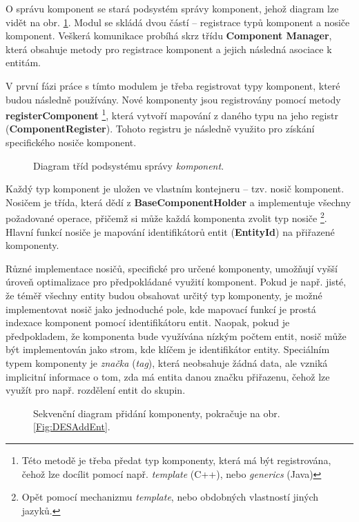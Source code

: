 O správu komponent se stará podsystém správy komponent, jehož diagram lze vidět na obr. \ref{Fig:DESCompDiag}. Modul se skládá dvou částí -- registrace typů komponent a nosiče komponent. Veškerá komunikace probíhá skrz třídu \textbf{Component Manager}, která obsahuje metody pro registrace komponent a jejich následná asociace k entitám. 

V první fázi práce s tímto modulem je třeba registrovat typy komponent, které budou následně používány. Nové komponenty jsou registrovány pomocí metody \textbf{registerComponent} \footnote{Této metodě je třeba předat typ komponenty, která má být registrována, čehož lze docílit pomocí např. \emph{template} (C++), nebo \emph{generics} (Java)}, která vytvoří mapování z daného typu na jeho registr (\textbf{ComponentRegister}). Tohoto registru je následně využito pro získání specifického nosiče komponent.

\begin{figure}[H]
	\caption{Diagram tříd podsystému správy \emph{komponent}.}
	\label{Fig:DESCompDiag}
\end{figure}

Každý typ komponent je uložen ve vlastním kontejneru -- tzv. nosič komponent. Nosičem je třída, která dědí z \textbf{BaseComponentHolder} a implementuje všechny požadované operace, přičemž si může každá komponenta zvolit typ nosiče \footnote{Opět pomocí mechanizmu \emph{template}, nebo obdobných vlastností jiných jazyků.}. Hlavní funkcí nosiče je mapování identifikátorů entit (\textbf{EntityId}) na přiřazené komponenty. 

Různé implementace nosičů, specifické pro určené komponenty, umožňují vyšší úroveň optimalizace pro předpokládané využití komponent. Pokud je např. jisté, že téměř všechny entity budou obsahovat určitý typ komponenty, je možné implementovat nosič jako jednoduché pole, kde mapovací funkcí je prostá indexace komponent pomocí identifikátoru entit. Naopak, pokud je předpokladem, že komponenta bude využívána nízkým počtem entit, nosič může být implementován jako strom, kde klíčem je identifikátor entity. Speciálním typem komponenty je \emph{značka} (\emph{tag}), která neobsahuje žádná data, ale vzniká implicitní informace o tom, zda má entita danou značku přiřazenu, čehož lze využít pro např. rozdělení entit do skupin.

\begin{figure}[H]
	\caption{Sekvenční diagram přidání komponenty, pokračuje na obr. \ref{Fig:DESAddEnt}.}
	\label{Fig:DESAddComp}
\end{figure}

